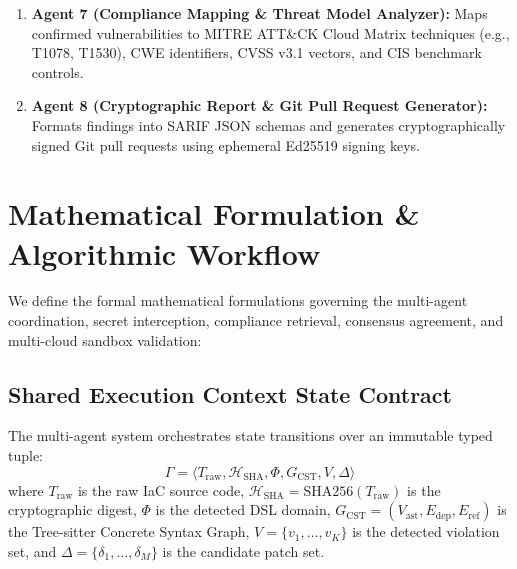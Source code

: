 \documentclass[runningheads]{llncs}
\begin{document}
\begin{enumerate}
\begin{itemize}
\begin{itemize}
            \item \textbf{AWS:} Validated in an isolated LocalStack v3.4 container~\cite{localstack2024} emulating 45+ AWS APIs via \texttt{terraform plan} and \texttt{terraform apply}.
            \item \textbf{Azure:} Validated using Microsoft Azurite (local emulator for Blob, Queue, and Table storage) coupled with the AzureRM Terraform Provider running in local mock mode (\texttt{terraform plan} with the \texttt{-detailed-exitcode} flag), validating resource graph resolution and state construction without live cloud billing.
            \item \textbf{GCP:} Validated using Google Cloud Local Emulators (Storage, Pub/Sub, Firestore) and GCP Provider dry-run planning, integrated with Google's \texttt{terraform vet} policy evaluator against Cloud Asset Inventory constraints.
            \item \textbf{Kubernetes:} Validated against isolated local \texttt{k3s}/\texttt{minikube} Docker clusters using \texttt{kubectl apply --dry-run=server}.
        \end{itemize}
    \end{itemize}
    \item \textbf{Agent 7 (Compliance Mapping \& Threat Model Analyzer):} Maps confirmed vulnerabilities to MITRE ATT\&CK Cloud Matrix techniques (e.g., T1078, T1530), CWE identifiers, CVSS v3.1 vectors, and CIS benchmark controls.
    \item \textbf{Agent 8 (Cryptographic Report \& Git Pull Request Generator):} Formats findings into SARIF JSON schemas and generates cryptographically signed Git pull requests using ephemeral Ed25519 signing keys.
\end{enumerate}


\section{Mathematical Formulation \& Algorithmic Workflow}
We define the formal mathematical formulations governing the multi-agent coordination, secret interception, compliance retrieval, consensus agreement, and multi-cloud sandbox validation:

\subsection{Shared Execution Context State Contract}
The multi-agent system orchestrates state transitions over an immutable typed tuple:
\begin{equation}
\Gamma = \langle T_{\mathrm{raw}}, \mathcal{H}_{\mathrm{SHA}}, \Phi, G_{\mathrm{CST}}, V, \Delta \rangle
\end{equation}
where $T_{\mathrm{raw}}$ is the raw IaC source code, $\mathcal{H}_{\mathrm{SHA}} = \mathrm{SHA256}(T_{\mathrm{raw}})$ is the cryptographic digest, $\Phi$ is the detected DSL domain, $G_{\mathrm{CST}} = (V_{\mathrm{ast}}, E_{\mathrm{dep}}, E_{\mathrm{ref}})$ is the Tree-sitter Concrete Syntax Graph, $V = \{v_1, \dots, v_K\}$ is the detected violation set, and $\Delta = \{\delta_1, \dots, \delta_M\}$ is the candidate patch set.
\end{document}
